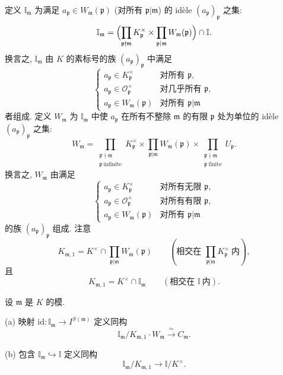 定义 $\mathbb{I}_{\mathfrak{m}}$ 为满足 $a_{\mathfrak{p}}\in W_{\mathfrak{m}}(\mathfrak{p})$ (对所有 $\mathfrak{p}|\mathfrak{m}$) 的 idèle $(a_{\mathfrak{p}})_{\mathfrak{p}}$ 之集:
\[
\mathbb{I}_{\mathfrak{m}}=\Bigl(\prod_{\mathfrak{p}\nmid\mathfrak{m}}K_{\mathfrak{p}}^{\times}\times\prod_{\mathfrak{p}|\mathfrak{m}}W_{\mathfrak{m}}(\mathfrak{p})\Bigr)\cap\mathbb{I}.
\]
换言之, $\mathbb{I}_{\mathfrak{m}}$ 由 $K$ 的素标号的族 $(a_{\mathfrak{p}})_{\mathfrak{p}}$ 中满足
\[
\begin{cases}
a_{\mathfrak{p}}\in K_{\mathfrak{p}}^{\times} & \text{对所有 }\mathfrak{p},\\
a_{\mathfrak{p}}\in\mathcal{O}_{\mathfrak{p}}^{\times} & \text{对几乎所有 }\mathfrak{p},\\
a_{\mathfrak{p}}\in W_{\mathfrak{m}}(\mathfrak{p}) & \text{对所有 }\mathfrak{p}|\mathfrak{m}
\end{cases}
\]
者组成. 定义 $W_{\mathfrak{m}}$ 为 $\mathbb{I}_{\mathfrak{m}}$ 中使 $a_{\mathfrak{p}}$ 在所有不整除 $\mathfrak{m}$ 的有限 $\mathfrak{p}$ 处为单位的 idèle $(a_{\mathfrak{p}})_{\mathfrak{p}}$ 之集:
\[
W_{\mathfrak{m}}=\prod_{\substack{\mathfrak{p}\nmid\mathfrak{m}\\ \mathfrak{p}\ \mathrm{infinite}}}K_{\mathfrak{p}}^{\times}\times\prod_{\mathfrak{p}|\mathfrak{m}}W_{\mathfrak{m}}(\mathfrak{p})\times\prod_{\substack{\mathfrak{p}\nmid\mathfrak{m}\\ \mathfrak{p}\ \mathrm{finite}}}U_{\mathfrak{p}}.
\]
换言之, $W_{\mathfrak{m}}$ 由满足
\[
\begin{cases}
a_{\mathfrak{p}}\in K_{\mathfrak{p}}^{\times} & \text{对所有无限 }\mathfrak{p},\\
a_{\mathfrak{p}}\in\mathcal{O}_{\mathfrak{p}}^{\times} & \text{对所有有限 }\mathfrak{p},\\
a_{\mathfrak{p}}\in W_{\mathfrak{m}}(\mathfrak{p}) & \text{对所有 }\mathfrak{p}|\mathfrak{m}
\end{cases}
\]
的族 $(a_{\mathfrak{p}})_{\mathfrak{p}}$ 组成. 注意
\[
K_{\mathfrak{m},1}=K^{\times}\cap\prod_{\mathfrak{p}|\mathfrak{m}}W_{\mathfrak{m}}(\mathfrak{p})\qquad(\text{相交在 }\prod_{\mathfrak{p}|\mathfrak{m}}K_{\mathfrak{p}}^{\times}\ \text{内}),
\]
且
\[
K_{\mathfrak{m},1}=K^{\times}\cap\mathbb{I}_{\mathfrak{m}}\qquad(\text{相交在 }\mathbb{I}\ \text{内}).
\]

\begin{proposition}\label{prop:v.4.6}
设 $\mathfrak{m}$ 是 $K$ 的模.

(a) 映射 $\mathrm{id}\colon\mathbb{I}_{\mathfrak{m}}\to I^{S(\mathfrak{m})}$ 定义同构
\[
\mathbb{I}_{\mathfrak{m}}/K_{\mathfrak{m},1}\cdot W_{\mathfrak{m}}\xrightarrow{\ \simeq\ }C_{\mathfrak{m}}.
\]

(b) 包含 $\mathbb{I}_{\mathfrak{m}}\hookrightarrow\mathbb{I}$ 定义同构
\[
\mathbb{I}_{\mathfrak{m}}/K_{\mathfrak{m},1}\to\mathbb{I}/K^{\times}.
\]
\end{proposition}

